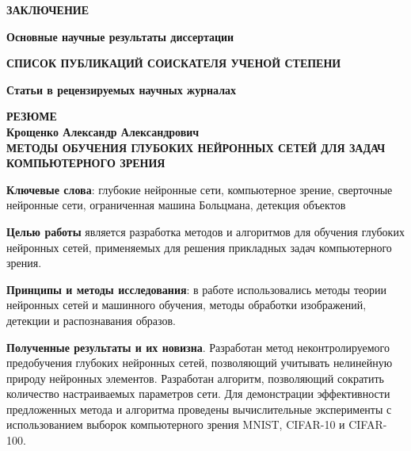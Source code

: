 \documentclass{thesisby}
\begin{document}
\bigskip
\centerline{\bf ЗАКЛЮЧЕНИЕ}
\smallskip
{\bf Основные научные результаты диссертации}
\smallskip



\medskip




\def\selectlanguageifdefined#1{
\expandafter\ifx\csname date#1\endcsname\relax
\else\language\csname l@#1\endcsname\fi}

\bigskip
\centerline{\bf СПИСОК ПУБЛИКАЦИЙ СОИСКАТЕЛЯ УЧЕНОЙ СТЕПЕНИ}

\vspace{1mm}
{\bf Статьи в рецензируемых научных журналах}
\vspace{2mm}

\begin{enumerate}[wide, labelindent=10mm]



\end{enumerate}

\newpage
\begin{center}
\bf РЕЗЮМЕ
\\[1mm]\rm Крощенко Александр Александрович\\[1mm] \bf
МЕТОДЫ ОБУЧЕНИЯ ГЛУБОКИХ НЕЙРОННЫХ СЕТЕЙ ДЛЯ ЗАДАЧ КОМПЬЮТЕРНОГО ЗРЕНИЯ
 \end{center}

{\bf Ключевые слова}: глубокие нейронные сети, компьютерное зрение, сверточные нейронные сети, ограниченная машина Больцмана, детекция объектов

\textbf{Целью работы} является разработка методов и алгоритмов для обучения глубоких нейронных сетей, применяемых для решения прикладных задач компьютерного зрения.

\textbf{Принципы и методы исследования}: в работе использовались методы теории нейронных сетей и машинного обучения, методы обработки изображений, детекции и распознавания образов.

\textbf{Полученные результаты и их новизна}.
Разработан метод неконтролируемого предобучения глубоких нейронных сетей, позволяющий учитывать нелинейную природу нейронных элементов. Разработан алгоритм, позволяющий сократить количество настраиваемых параметров сети. Для демонстрации эффективности предложенных метода и алгоритма проведены вычислительные эксперименты с использованием выборок компьютерного зрения MNIST, CIFAR-10 и CIFAR-100.
\end{document}
